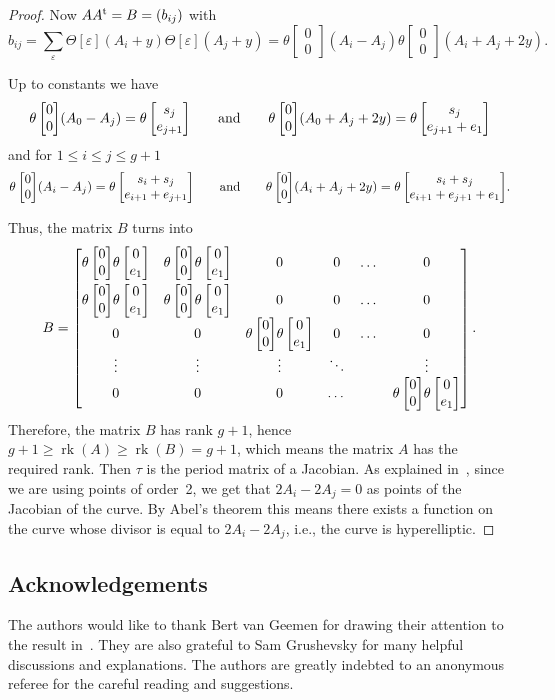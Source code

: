 \documentclass[pdftex]{sigma}
\numberwithin{equation}{section}
\newcommand{\ep}{\varepsilon}
\def\t{\theta}
\def\T{\Theta}
\def\tt#1#2{{\t\left[\begin{matrix}{#1}\\ {#2}\end{matrix}\right]}}
\begin{document}
\begin{proof}
 Now $A A^{\rm t}= B=(b_{ij}) $ with
\[
b_{ij}=\sum_{\ep} \T[\ep] (A_i+y)\T[\ep] (A_j+y)=\tt {0}{0}(A_i-A_j)\tt {0}{0}(A_i+A_j+2y).
\]

Up to constants we have
\[
\tt {0}{0}(A_0-A_j)=\tt{s_j}{e_{j+1}} \qquad {\rm and}\qquad \tt {0}{0}(A_0+A_j+2y)=\tt{s_j}{e_{j+1}+e_1}
\]
and for $1\leq i\leq j\leq g+1$
\[
\tt {0}{0}(A_i-A_j)=\tt{s_i+s_j}{e_{i+1}+e_{j+1}} \qquad {\rm and}\qquad \tt {0}{0}(A_i+A_j+2y)=\tt{s_i+s_j}{e_{i+1}+e_{j+1}+e_1}.
\]

Thus, the matrix $B$ turns into
\[ B=
 \begin{bmatrix} \tt {0}{0} \tt {0}{e_1} & \tt {0}{0} \tt {0}{e_1}&0&0&\dots&0\vspace{1mm}\\
\tt {0}{0} \tt {0}{e_1} & \tt {0}{0} \tt {0}{e_1}&0&0&\dots&0\\
0& 0&\tt {0}{0} \tt {0}{e_1}&0&\dots&0\\
\vdots & \vdots &\vdots &\ddots& &\vdots\\
0& 0&0&\dots& &\tt {0}{0} \tt {0}{e_1}
 \end{bmatrix}.
\]
Therefore, the matrix $B$ has rank $g+1$, hence $g+1\geq \operatorname{rk}(A)\geq \operatorname{rk}(B)=g+1$, which means the matrix $A$ has the required rank. Then $\tau$ is the period matrix of a Jacobian. As explained in~\cite{Gr}, since we are using points of order~2, we get that $2A_i- 2A_j=0$ as points of the Jacobian of the curve. By Abel's theorem this means there exists a function on the curve whose divisor is equal to $2A_i -2A_j$, i.e., the curve is hyperelliptic.
\end{proof}

\subsection*{Acknowledgements}
The authors would like to thank Bert van Geemen for drawing their attention to the result in~\cite{vG2}. They are also grateful to Sam Grushevsky for many helpful discussions and explanations. The authors are greatly indebted to an anonymous referee for the careful reading and suggestions.
\end{document}
